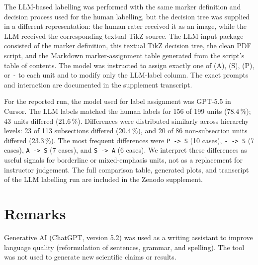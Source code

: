 \documentclass{article}
\begin{document}
The LLM-based labelling was performed with the same marker definition and decision process used for the human labelling, but the decision tree was supplied in a different representation: the human rater received it as an image, while the LLM received the corresponding textual TikZ source. The LLM input package consisted of the marker definition, this textual TikZ decision tree, the clean PDF script, and the Markdown marker-assignment table generated from the script's table of contents. The model was instructed to assign exactly one of (A), (S), (P), or \texttt{-} to each unit and to modify only the LLM-label column. The exact prompts and interaction are documented in the supplement transcript.\par

For the reported run, the model used for label assignment was GPT-5.5 in Cursor. The LLM labels matched the human labels for 156 of 199 units (78.4\,\%); 43 units differed (21.6\,\%). Differences were distributed similarly across hierarchy levels: 23 of 113 subsections differed (20.4\,\%), and 20 of 86 non-subsection units differed (23.3\,\%). The most frequent differences were \texttt{P -> S} (10 cases), \texttt{- -> S} (7 cases), \texttt{A -> S} (7 cases), and \texttt{S -> A} (6 cases). We interpret these differences as useful signals for borderline or mixed-emphasis units, not as a replacement for instructor judgement. The full comparison table, generated plots, and transcript of the LLM labelling run are included in the Zenodo supplement.

\section{Remarks}
Generative AI (ChatGPT, version 5.2) was used as a writing assistant to improve language quality (reformulation of sentences, grammar, and spelling). The tool was not used to generate new scientific claims or results.
\end{document}
